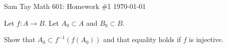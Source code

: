 \documentclass[11pt]{article}
\newenvironment{ex}[2][Exercise]{
  \begin{trivlist}
    \item[\hskip \labelsep {\bfseries #1}\hskip \labelsep {\bfseries #2.}]}
  {\end{trivlist}}
\newenvironment{p}[1]{
  \begin{trivlist}
\item[\hskip \labelsep {\bfseries (#1)}]}
  {\end{trivlist}}
\begin{document}

\noindent Sam Tay \hfill {\large Math 601: Homework \#1} \hfill \today
\vspace{2em}


\vspace{.8em}

\begin{ex}{2.1}
  Let $f:A \to B$. Let $A_0 \subset A$ and $B_0 \subset B$.
\end{ex}

\begin{p}{a}
  Show that $A_0 \subset f^{-1}(f(A_0))$ and that equality holds if $f$ is injective.
\end{p}
\end{document}
